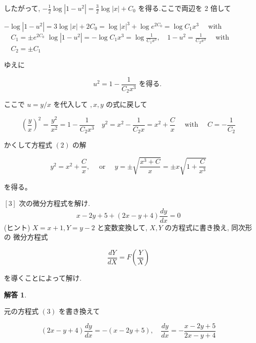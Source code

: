 \documentclass[10pt]{jsarticle}
\newtheorem*{answer*}{解答}
\begin{document}
したがって, $-\frac{1}{2} \log \left|1-u^{2}\right|=\frac{3}{2} \log |x|+C_{0}$ を得る.ここで両辺を 2 倍して

$-\log \left|1-u^{2}\right|=3 \log |x|+2 C_{0}=\log |x|^{3}+\log e^{2 C_{0}}=\log C_{1} x^{3} \quad$ with $\quad C_{1}= \pm e^{2 C_{0}}$ $\log \left|1-u^{2}\right|=-\log C_{1} x^{3}=\log \frac{1}{C_{1} x^{3}}, \quad 1-u^{2}=\frac{1}{C_{2} x^{3}} \quad$ with $\quad C_{2}= \pm C_{1}$

ゆえに


\begin{equation*}
u^{2}=1-\frac{1}{C_{2} x^{3}} \text { を得る. } \tag{*3}
\end{equation*}


ここで $u=y / x$ を代入して $, x, y$ の式に戻して

$$
\left(\frac{y}{x}\right)^{2}=\frac{y^{2}}{x^{2}}=1-\frac{1}{C_{2} x^{3}} \quad y^{2}=x^{2}-\frac{1}{C_{2} x}=x^{2}+\frac{C}{x} \quad \text { with } \quad C=-\frac{1}{C_{2}}
$$

かくして方程式 $(2)$ の解

$$
y^{2}=x^{2}+\frac{C}{x}, \quad \text { or } \quad y= \pm \sqrt{\frac{x^{3}+C}{x}}= \pm x \sqrt{1+\frac{C}{x^{3}}}
$$

を得る。

\bigskip
\bigskip
\bigskip
\bigskip
\bigskip
\bigskip
\bigskip
\bigskip

\begin{itembox}[l]{$[3]$ 次の微分方程式を解け.}
\begin{equation*}
x-2 y+5+(2 x-y+4) \frac{d y}{d x}=0 \tag{3}
\end{equation*} 
(ヒント) $X=x+1, Y=y-2$ と変数変換して, $X, Y$ の方程式に書き換え, 同次形の 微分方程式


\begin{equation*}
\frac{d Y}{d X}=F\left(\frac{Y}{X}\right) \tag{4}
\end{equation*}


を導くことによって解け.
\end{itembox}


\bigskip

\begin{answer*}
\end{answer*}

元の方程式 $(3)$ を書き換えて


\begin{equation*}
(2 x-y+4) \frac{d y}{d x}=-(x-2 y+5), \quad \frac{d y}{d x}=-\frac{x-2 y+5}{2 x-y+4} \tag{*1}
\end{equation*}
\end{document}
